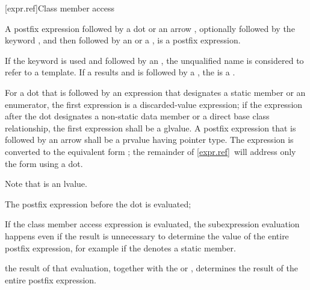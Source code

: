 [expr.ref]{Class member access}

\pnum
{}%
%
%
%
%
%
%
%
%
%
A postfix expression followed by a dot  or an arrow \tcode{->},
optionally followed by the keyword
, and then followed by an
 or a ,
is a postfix expression.
\begin{note}
If the keyword  is used and
followed by an ,
the unqualified name
is considered to refer to a template.
If a  results and is followed by a \tcode{::},
the  is a .
\end{note}

\pnum
{}%
For a dot that is followed by an expression
that designates a static member or an enumerator,
the first expression is a discarded-value expression;
if the expression after the dot designates a
non-static data member or
a direct base class relationship,
the first expression shall be a glvalue.
A postfix expression that is followed by an arrow
shall be a prvalue having pointer type.
The expression  is
converted to the equivalent form ; the remainder of
\ref{expr.ref}~will address only the form using a dot.
\begin{footnote}
Note that
 is an lvalue.
\end{footnote}

\pnum
The postfix expression before the dot is evaluated;
\begin{footnote}
If the class member
access expression is evaluated, the subexpression evaluation happens even if the
result is unnecessary to determine
the value of the entire postfix expression, for example if the
 denotes a static member.
\end{footnote}
the result of that evaluation,
together with
the  or ,
determines the result of the entire postfix expression.

